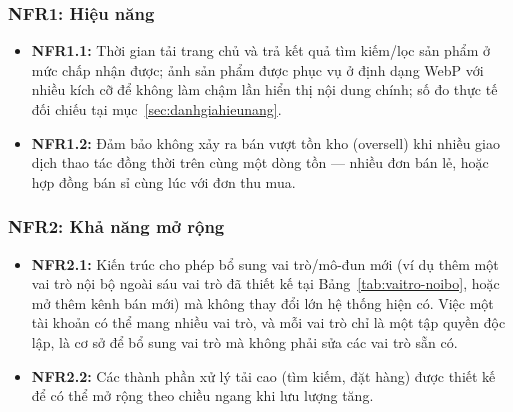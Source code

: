\subsubsection*{NFR1: Hiệu năng}
\begin{itemize}
    \item \textbf{NFR1.1:} Thời gian tải trang chủ và trả kết quả tìm
    kiếm/lọc sản phẩm ở mức chấp nhận được; ảnh sản phẩm được phục vụ ở định
    dạng WebP với nhiều kích cỡ để không làm chậm lần hiển thị nội dung chính;
    số đo thực tế đối chiếu tại mục~\ref{sec:danhgiahieunang}.
    \item \textbf{NFR1.2:} Đảm bảo không xảy ra bán vượt tồn kho (oversell)
    khi nhiều giao dịch thao tác đồng thời trên cùng một dòng tồn --- nhiều đơn bán lẻ, hoặc hợp đồng bán sỉ cùng lúc với đơn thu mua.
\end{itemize}

\subsubsection*{NFR2: Khả năng mở rộng}
\begin{itemize}
    \item \textbf{NFR2.1:} Kiến trúc cho phép bổ sung vai trò/mô-đun mới
    (ví dụ thêm một vai trò nội bộ ngoài sáu vai trò đã thiết kế tại
    Bảng~\ref{tab:vaitro-noibo}, hoặc mở thêm kênh bán mới) mà không
    thay đổi lớn hệ thống hiện có. Việc một tài khoản có thể mang nhiều vai
    trò, và mỗi vai trò chỉ là một tập quyền độc lập, là cơ sở để bổ sung vai
    trò mà không phải sửa các vai trò sẵn có.
    \item \textbf{NFR2.2:} Các thành phần xử lý tải cao (tìm kiếm, đặt
    hàng) được thiết kế để có thể mở rộng theo chiều ngang khi lưu lượng
    tăng.
\end{itemize}

